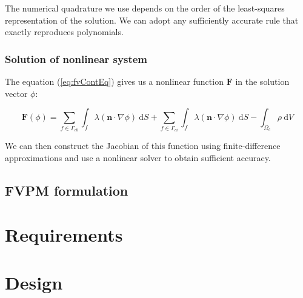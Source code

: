 \documentclass[12pt]{article}
\newcommand{\labelSec}[1]{\label{sec:#1}}
\newcommand{\refEq}[1]{(\ref{eq:#1})}
\renewcommand{\vec}[1]{\mathbf{#1}}
\newcommand{\grad}[1]{\nabla#1}
\newcommand{\dV}{~\mathrm{d}V}
\newcommand{\dS}{~\mathrm{d}S}
\begin{document}
The numerical quadrature we use depends on the order of the least-squares representation of the solution. We can adopt any sufficiently
accurate rule that exactly reproduces polynomials.

\subsubsection*{Solution of nonlinear system}

The equation \refEq{fvContEq} gives us a nonlinear function $\vec{F}$ in the solution vector $\phi$:

\begin{equation}
\vec{F}(\phi) = \sum_{f \in \Gamma_{cb}}\int_f \lambda (\vec{n}\cdot\grad{\phi}) \dS + 
\sum_{f \in \Gamma_{ci}}\int_f \lambda (\vec{n}\cdot\grad{\phi}) \dS - \int_{\Omega_c} \rho \dV
\end{equation}

We can then construct the Jacobian of this function using finite-difference approximations and use a nonlinear solver 
to obtain sufficient accuracy.

\subsection{FVPM formulation}

\section{Requirements}\labelSec{Requirements}

\section{Design}\labelSec{Design}



\end{document}
